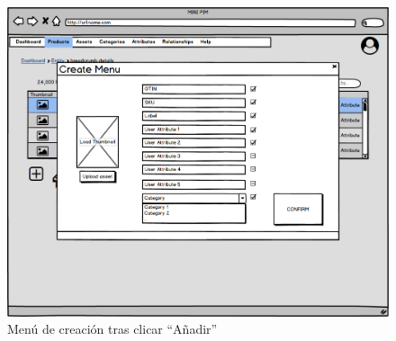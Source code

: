 \begin{figure}[H]
    \includegraphics[width=1\linewidth]{mockups/RF2.1_bocetoCreacionV2.png}
    \caption{Menú de creación tras clicar \enquote{Añadir}}
   \end{figure}
\vspace{1.0cm}

\newpage %